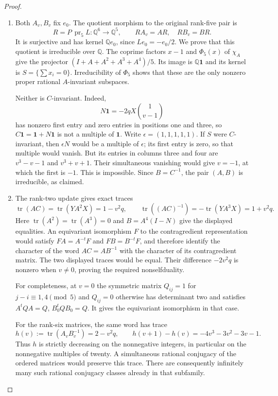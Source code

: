 \begin{proof}
\begin{enumerate}[label={$\langle1\rangle$\arabic*.}]
\item Both $A_v,B_v$ fix $e_0$. The quotient morphism to
the original rank-five pair is
\[
 R=P\,\operatorname{pr}_5 L:\mathbb Q^6\longrightarrow\mathbb Q^5,
 \qquad RA_v=AR,\quad RB_v=BR.
\]
It is surjective and has kernel $\mathbb Qe_0$, since
$Le_0=-e_0/2$. We prove that this quotient is irreducible over
$\mathbb Q$. The coprime factors $x-1$ and $\Phi_5(x)$ of
$\chi_A$ give the projector
$(I+A+A^2+A^3+A^4)/5$. Its image is $\mathbb Q\mathbf1$ and
its kernel is $S=\{\sum x_i=0\}$. Irreducibility of $\Phi_5$
shows that these are the only nonzero proper rational
$A$-invariant subspaces.

Neither is $C$-invariant. Indeed,
\[
 N\mathbf1=-2qX\binom{1}{v-1}
\]
has nonzero first entry and zero entries in positions one and three,
so $C\mathbf1=\mathbf1+N\mathbf1$ is not a multiple of
$\mathbf1$. Write $\epsilon=(1,1,1,1,1)$. If $S$ were
$C$-invariant, then $\epsilon N$ would be a multiple of
$\epsilon$; its first entry is zero, so that multiple would
vanish. But its entries in columns three and four are
$v^3-v-1$ and $v^3+v+1$. Their simultaneous vanishing would
give $v=-1$, at which the first is $-1$. This is impossible.
Since $B=C^{-1}$, the pair $(A,B)$ is irreducible, as claimed.

\item The rank-two update gives exact traces
\[
 \operatorname{tr}(AC)=\operatorname{tr}(YA^2X)=1-v^2q,
 \qquad
 \operatorname{tr}((AC)^{-1})
       =-\operatorname{tr}(YA^3X)=1+v^2q.
\]
Here $\operatorname{tr}(A^2)=\operatorname{tr}(A^3)=0$ and
$B=A^4(I-N)$ give the displayed equalities. An equivariant
isomorphism $F$ to the contragredient representation would
satisfy $FA=A^{-t}F$ and $FB=B^{-t}F$, and therefore identify
the character of the word $AC=AB^{-1}$ with the character
of its contragredient matrix. The two displayed traces would
be equal. Their difference $-2v^2q$ is nonzero when $v\ne0$,
proving the required nonselfduality.

For completeness, at $v=0$ the symmetric matrix
$Q_{ij}=1$ for $j-i\equiv1,4\pmod5$ and $Q_{ij}=0$ otherwise
has determinant two and satisfies $A^tQA=Q$, $B_0^tQB_0=Q$.
It gives the equivariant isomorphism in that case.

For the rank-six matrices, the same word has trace
\[
 h(v):=\operatorname{tr}(A_vB_v^{-1})=2-v^2q,
 \qquad h(v+1)-h(v)=-4v^3-3v^2-3v-1.
\]
Thus $h$ is strictly decreasing on the nonnegative integers,
in particular on the nonnegative multiples of twenty.
A simultaneous rational conjugacy of the ordered matrices
would preserve this trace. There are consequently infinitely
many such rational conjugacy classes already in that subfamily.


\end{enumerate}
\end{proof}
